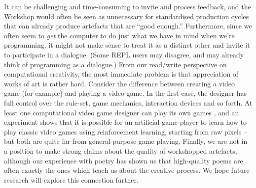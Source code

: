 It can be challenging and time-consuming to invite and process feedback, and the Workshop would
often be seen as unnecessary for standardised production cycles that can already produce artefacts that are ``good enough.''
Furthermore, since we often seem to \emph{get} the computer to do just what we have in mind when we're programming,
it might not make sense to treat it as a distinct other and invite it to participate in a dialogue.
(Some REPL users may disagree, and may already think of programming as a dialogue.)
%
%
From our read/write perspective on computational creativity, the most immediate problem is that appreciation of
works of art is rather hard.  Consider the difference between creating a
video game (for example) and playing a video game.  In the first case,
the designer has full control over the rule-set, game mechanics,
interaction devices and so forth.  At least one
computational video game designer can play its own games \cite{cook2013mechanic},
and an experiment shows that it is possible for an artificial game player
to learn how to play classic video games using reinforcement learning, starting
from raw pixels \cite{deepmind-atari} -- but both are quite far from
general-purpose game playing.
%
Finally, we are not in a position to make strong claims about the quality of workshopped artefacts,
although our experience with poetry has shown us that high-quality poems are often exactly
the ones which teach us about the creative process.
We hope future research will explore this connection further.

